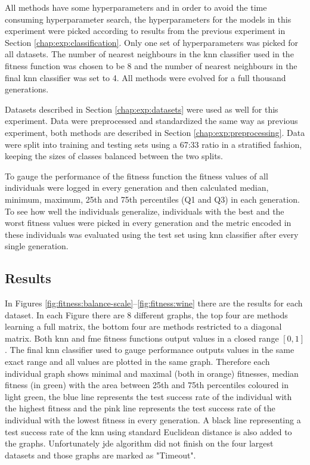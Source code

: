 \documentclass[12pt,a4paper]{report}
\begin{document}
All methods have some hyperparameters and in order to avoid the time consuming hyperparameter search, the hyperparameters for the models in this experiment were picked according to results from the previous experiment in Section \ref{chap:exp:classification}. Only one set of hyperparameters was picked for all datasets. The number of nearest neighbours in the \ac{knn} classifier used in the fitness function was chosen to be 8 and the number of nearest neighbours in the final \ac{knn} classifier was set to 4. All methods were evolved for a full thousand generations.

Datasets described in Section \ref{chap:exp:datasets} were used as well for this experiment. Data were preprocessed and standardized the same way as previous experiment, both methods are described in Section \ref{chap:exp:preprocessing}. Data were split into training and testing sets using a 67:33 ratio in a stratified fashion, keeping the sizes of classes balanced between the two splits.

To gauge the performance of the fitness function the fitness values of all individuals were logged in every generation and then calculated median, minimum, maximum, 25th and 75th percentiles (Q1 and Q3) in each generation. To see how well the individuals generalize, individuals with the best and the worst fitness values were picked in every generation and the metric encoded in these individuals was evaluated using the test set using \ac{knn} classifier after every single generation.

\subsection{Results}

In Figures \ref{fig:fitness:balance-scale}--\ref{fig:fitness:wine} there are the results for each dataset. In each Figure there are 8 different graphs, the top four are methods learning a full matrix, the bottom four are methods restricted to a diagonal matrix. Both \ac{knn} and \ac{fme} fitness functions output values in a closed range $[0,1]$. The final \ac{knn} classifier used to gauge performance outputs values in the same exact range and all values are plotted in the same graph. Therefore each individual graph shows minimal and maximal (both in orange) fitnesses, median fitness (in green) with the area between 25th and 75th percentiles coloured in light green, the blue line represents the test success rate of the individual with the highest fitness and the pink line represents the test success rate of the individual with the lowest fitness in every generation. A black line representing a test success rate of the \ac{knn} using standard Euclidean distance is also added to the graphs. Unfortunately \ac{jde} algorithm did not finish on the four largest datasets and those graphs are marked as "Timeout".
\end{document}
